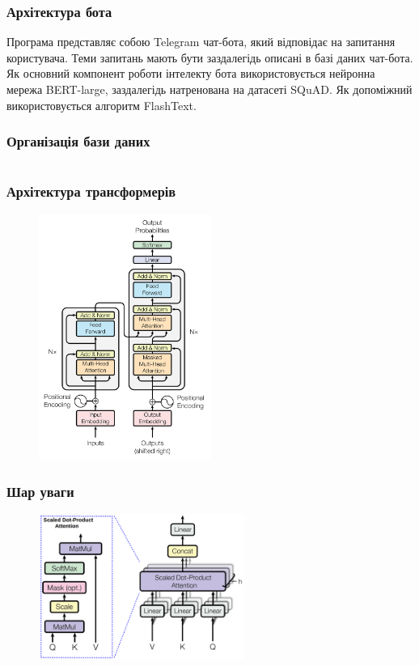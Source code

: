 \documentclass{beamer}
\begin{document}
\begin{frame}
    \frametitle{Архітектура бота}
    Програма представляє собою Telegram чат-бота, який відповідає на запитання користувача. Теми запитань мають бути заздалегідь описані в базі даних чат-бота. Як основний компонент роботи інтелекту бота використовується нейронна мережа BERT-large, заздалегідь натренована на датасеті SQuAD. Як допоміжний використовується алгоритм FlashText.
\end{frame}

\begin{frame}
    \frametitle{Організація бази даних}
    \inputminted[breaklines,linenos=true]{yaml}{sample.yaml}
\end{frame}

\begin{frame}
    \frametitle{Архітектура трансформерів}
    \begin{figure}[H]
        \centering
        \includegraphics[width=0.5\textwidth]{transformer.png}
    \end{figure}
\end{frame}

\begin{frame}
    \frametitle{Шар уваги}
    \begin{figure}[H]
        \centering
        \includegraphics[width=0.6\textwidth]{attention_layer.png}
    \end{figure}
\end{frame}
\end{document}
